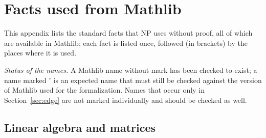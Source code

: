 \section{Facts used from Mathlib}\label{app:mathlib}
This appendix lists the standard facts that NP uses without proof, all of which are available in Mathlib; each fact is listed once, followed (in brackets) by the places where it is used.

\emph{Status of the names.} A Mathlib name without mark has been checked to exist; a name marked $^\circ$ is an expected name that must still be checked against the version of Mathlib
used for the formalization. Names that occur only in Section~\ref{sec:edge} are not marked individually and should be checked as well.

\subsection{Linear algebra and matrices}
